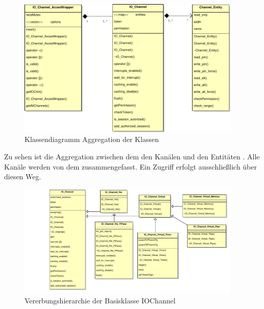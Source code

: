 \begin{figure}[H]
	\begin{center}
		\includegraphics[width=0.95\textwidth ,clip]{./code/Aggregation.pdf}
		\caption{Klassendiagramm Aggregation der Klassen}
		\label{img:classAgregation}
	\end{center} 
\end{figure}	
Zu sehen ist die Aggregation zwischen dem  den Kanälen  und den Entitäten . Alle Kanäle werden von dem   zusammengefasst. Ein Zugriff erfolgt ausschließlich über diesen Weg. 


\begin{figure}[H]
	\begin{center}
		\includegraphics[width=0.95\textwidth ,clip]{./code/IOChannel.pdf}
		\caption{Vererbungshierarchie der Basisklasse IOChannel}
		\label{img:classIOChannel}
	\end{center} 
\end{figure}	

